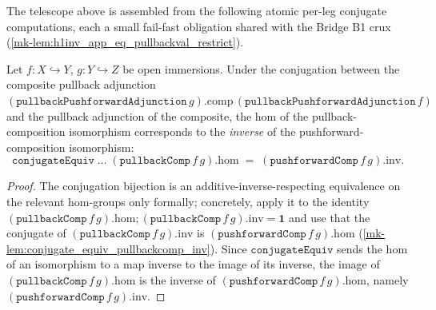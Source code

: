 The telescope above is assembled from the following atomic per-leg conjugate computations, each a
small fail-fast obligation shared with the Bridge B1 crux
(\ref{mk-lem:h1inv_app_eq_pullbackval_restrict}).

\begin{lemma}\label{mk-lem:conjugateequiv_pullbackcomp_hom}
  \leanok

  Let \(f : X \hookrightarrow Y\), \(g : Y \hookrightarrow Z\) be open immersions. Under the
  conjugation between the composite pullback adjunction
  \((\mathtt{pullbackPushforwardAdjunction}\,g).\mathrm{comp}\,(\mathtt{pullbackPushforwardAdjunction}\,f)\)
  and the pullback adjunction of the composite, the hom of the pullback-composition isomorphism
  corresponds to the \emph{inverse} of the pushforward-composition isomorphism:
  \[
    \mathtt{conjugateEquiv}\;\dots\;(\mathtt{pullbackComp}\,f\,g).\mathrm{hom}
      \;=\; (\mathtt{pushforwardComp}\,f\,g).\mathrm{inv}.
  \]
\end{lemma}
\begin{proof}
  \leanok
  The conjugation bijection is an additive-inverse-respecting equivalence on the relevant hom-groups
  only formally; concretely, apply it to the identity
  \((\mathtt{pullbackComp}\,f\,g).\mathrm{hom} \mathbin{;} (\mathtt{pullbackComp}\,f\,g).\mathrm{inv}
  = \mathbf{1}\) and use that the conjugate of \((\mathtt{pullbackComp}\,f\,g).\mathrm{inv}\) is
  \((\mathtt{pushforwardComp}\,f\,g).\mathrm{hom}\) (\ref{mk-lem:conjugate_equiv_pullbackcomp_inv}).
  Since \(\mathtt{conjugateEquiv}\) sends the hom of an isomorphism to a map inverse to the image of
  its inverse, the image of \((\mathtt{pullbackComp}\,f\,g).\mathrm{hom}\) is the inverse of
  \((\mathtt{pushforwardComp}\,f\,g).\mathrm{hom}\), namely \((\mathtt{pushforwardComp}\,f\,g).\mathrm{inv}\).
\end{proof}

